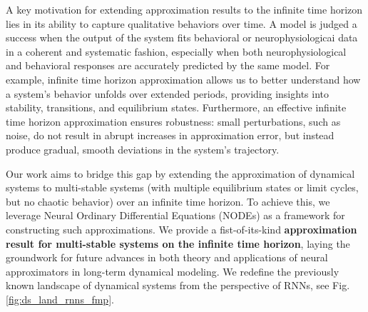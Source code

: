 \documentclass{article}
\theoremstyle{definition} \newtheorem{definition}{Definition}
\theoremstyle{remark} \newtheorem{remark}{Remark}
\newcounter{ct}
\begin{document}
A key motivation for extending approximation results to the infinite time horizon lies in its ability to capture qualitative behaviors over time.
A model is judged a success when the output of the system fits behavioral or neurophysiologicai data in a coherent and systematic fashion, especially when both neurophysiological and behavioral responses are accurately predicted by the same model.
 For example, infinite time horizon approximation allows us to better understand how a system's behavior unfolds over extended periods, providing insights into stability, transitions, and equilibrium states.
 Furthermore, an effective infinite time horizon approximation ensures robustness: small perturbations, such as noise, do not result in abrupt increases in approximation error, but instead produce gradual, smooth deviations in the system's trajectory.



Our work aims to bridge this gap by extending the approximation of dynamical systems to multi-stable systems (with multiple equilibrium states or limit cycles, but no chaotic behavior) over an infinite time horizon. 
To achieve this, we leverage Neural Ordinary Differential Equations (NODEs) as a framework for constructing such approximations.
We provide a fist-of-its-kind \textbf{approximation result for multi-stable systems on the infinite time horizon}, laying the groundwork for future advances in both theory and applications of neural approximators in long-term dynamical modeling.
We redefine the previously known landscape of dynamical systems from the perspective of RNNs, see Fig.\ref{fig:ds_land_rnns_fmp}.


\end{document}
